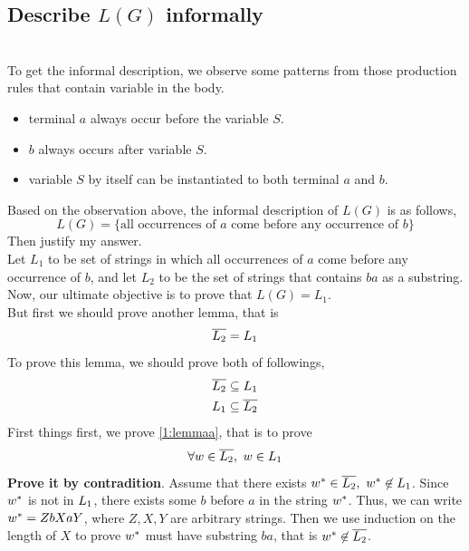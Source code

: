 \documentclass[11pt,a4paper]{article}
\newcommand{\htab}{\hspace*{0.63cm}}
\newcommand{\pg}{\\[0.3cm]}
\begin{document}
\subsection{Describe $L(G)$ informally}
\htab {Describe $L(G)$ informally. Justify your answer using part (1).} \pg
\htab To get the informal description, we observe some patterns from those production rules that contain variable in the body. 
\begin{itemize} \renewcommand{\labelitemi}{$\diamond$}
    \item{ terminal $a$ always occur before the variable $S$}. 
    \item{ $b$ always occurs after variable $S$}. 
    \item{ variable $S$ by itself can be instantiated to both terminal $a$ and $b$}.
\end{itemize}
\htab Based on the observation above, the informal description of $L(G)$ is as follows,
\begin{equation}
    L(G) = \{ \text{all occurrences of $a$ come before any occurrence of $b$} \}
    \end{equation}
\htab Then justify my answer. \pg
\htab Let $L_{1}$ to be set of strings in which all occurrences of $a$ come before any occurrence of $b$,
and let $L_{2}$ to be the set of strings that contains $ba$ as a substring.
Now, our ultimate objective is to prove that $L(G) = L_{1}$. \\
\htab But first we should prove another lemma, that is
\begin{align}
    \overline{L_{2}} = L_{1} \label{1:lemma}
    \end{align}
\htab To prove this lemma, we should prove both of followings, 
\begin{align}
    \overline{L_{2}} \subseteq L_{1}  \label{1:lemmaa}\\
    L_{1} \subseteq \overline{L_{2}}  \label{1:lemmab}
    \end{align}
\htab First things first, we prove \eqref{1:lemmaa}, that is to prove 
\begin{align}
    \forall w \in \overline{L_{2}},\ w \in L_{1}
    \end{align}
\htab \textbf{Prove it by contradition}. Assume that there exists $w^{*} \in \overline{L_{2}},\ w^{*} \not \in L_{1}$.
Since $w^{*}$ is not in $L_{1}$, there exists some $b$ before $a$ in the string $w^{*}$. Thus, we can
write $w^{*} = ZbXaY$, where $Z,X,Y$ are arbitrary strings. Then we use induction on the length of 
$X$ to prove $w^{*}$ must have substring $ba$, that is $w^{*} \not \in \overline{L_{2}}$. \\
\end{document}
